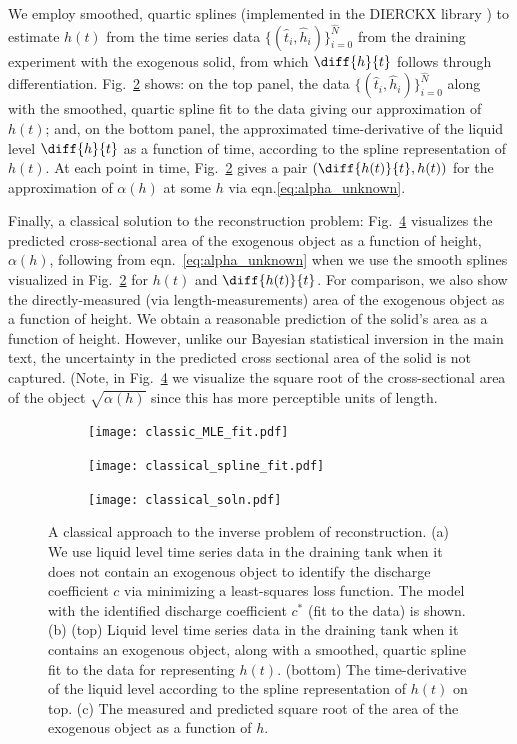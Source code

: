\documentclass[a4paper,fleqn]{cas-sc}
\begin{document}
We employ smoothed, quartic splines (implemented in the DIERCKX library \cite{dierckx1995curve}) to estimate $h(t)$ from the time series data $\{(\hat{t}_i, \hat{h}_i)\}_{i=0}^{\hat{N}}$ from the draining experiment with the exogenous solid, from which $\diff{h}{t}$ follows through differentiation.
Fig.~\ref{fig:spline_fit} shows: on the top panel, the data $\{(\hat{t}_i, \hat{h}_i)\}_{i=0}^{\hat{N}}$ along with the smoothed, quartic spline fit to the data giving our approximation of $h(t)$; and, on the bottom panel, the approximated time-derivative of the liquid level $\diff{h}{t}$ as a function of time, according to the spline representation of $h(t)$. At each point in time, Fig.~\ref{fig:spline_fit} gives a pair $\left(\diff{h(t)}{t}, h(t)\right)$ for the approximation of $\alpha(h)$ at some $h$ via eqn.\ref{eq:alpha_unknown}.

Finally, a classical solution to the reconstruction problem: Fig.~\ref{fig:classical_soln} visualizes the predicted cross-sectional area of the exogenous object as a function of height, $\alpha(h)$, following from eqn.~\ref{eq:alpha_unknown} when we use the smooth splines visualized in Fig.~\ref{fig:spline_fit} for $h(t)$ and $\diff{h(t)}{t}$. For comparison, we also show the directly-measured (via length-measurements) area of the exogenous object as a function of height. 
We obtain a reasonable prediction of the solid's area as a function of height. 
However, unlike our Bayesian statistical inversion in the main text, the uncertainty in the predicted cross sectional area of the solid is not captured.
(Note, in Fig.~\ref{fig:classical_soln} we visualize the square root of the cross-sectional area of the object $\sqrt{\alpha(h)}$ since this has more perceptible units of length.

\begin{figure}[h!]
	\centering
	\begin{subfigure}[b]{0.48\textwidth}
		\texttt{[image: classic\_MLE\_fit.pdf]} \caption{} \label{fig:mle}
	\end{subfigure}
	
	 \begin{subfigure}[b]{0.5\textwidth}
		\texttt{[image: classical\_spline\_fit.pdf]} \caption{} \label{fig:spline_fit}
	\end{subfigure}
	\begin{subfigure}[b]{0.4\textwidth}
		\texttt{[image: classical\_soln.pdf]} \caption{} \label{fig:classical_soln}
	\end{subfigure}
	\caption{A classical approach to the inverse problem of reconstruction.
	(a) We use liquid level time series data in the draining tank when it does not contain an exogenous object to identify the discharge coefficient $c$ via minimizing a least-squares loss function. The model with the identified discharge coefficient $c^*$ (fit to the data) is shown.
	(b) (top) Liquid level time series data in the draining tank when it contains an exogenous object, along with a smoothed, quartic spline fit to the data for representing $h(t)$. (bottom) The time-derivative of the liquid level according to the spline representation of $h(t)$ on top.
	(c) The measured and predicted square root of the area of the exogenous object as a function of $h$.
	}
\end{figure}
\end{document}
